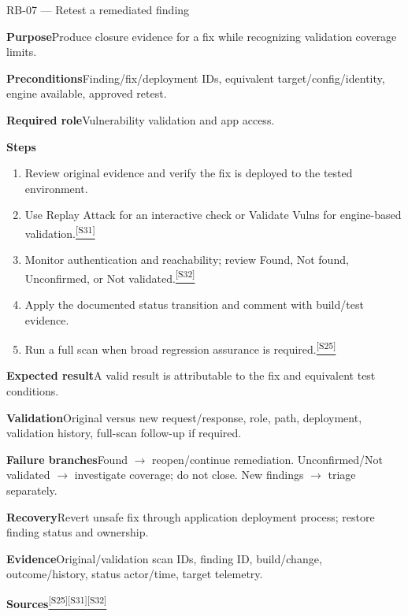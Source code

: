\documentclass[11pt,letterpaper,oneside]{scrreprt}
\newcommand{\src}[1]{\hyperref[src:#1]{\textsuperscript{\color{R7Orange}[#1]}}}
\newcommand{\field}[1]{\par\smallskip\noindent\textbf{#1}\quad}
\begin{document}
\begin{procedure}{RB-07 --- Retest a remediated finding}
\field{Purpose}Produce closure evidence for a fix while recognizing validation coverage limits.
\field{Preconditions}Finding/fix/deployment IDs, equivalent target/config/identity, engine available, approved retest.
\field{Required role}Vulnerability validation and app access.
\field{Steps}
\begin{enumerate}
  \item Review original evidence and verify the fix is deployed to the tested environment.
  \item Use Replay Attack for an interactive check or Validate Vulns for engine-based validation.\src{S31}
  \item Monitor authentication and reachability; review Found, Not found, Unconfirmed, or Not validated.\src{S32}
  \item Apply the documented status transition and comment with build/test evidence.
  \item Run a full scan when broad regression assurance is required.\src{S25}
\end{enumerate}
\field{Expected result}A valid result is attributable to the fix and equivalent test conditions.
\field{Validation}Original versus new request/response, role, path, deployment, validation history, full-scan follow-up if required.
\field{Failure branches}Found $\rightarrow$ reopen/continue remediation. Unconfirmed/Not validated $\rightarrow$ investigate coverage; do not close. New findings $\rightarrow$ triage separately.
\field{Recovery}Revert unsafe fix through application deployment process; restore finding status and ownership.
\field{Evidence}Original/validation scan IDs, finding ID, build/change, outcome/history, status actor/time, target telemetry.
\field{Sources}\src{S25}\src{S31}\src{S32}
\end{procedure}
\end{document}
